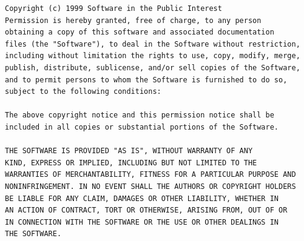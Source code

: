 \documentclass[mingoth,a4paper]{jsarticle}
\begin{document}
{{{{{{{{{\begin{multicols}{2}
\begin{fontsize}{6}{6}
\begin{verbatim}
Copyright (c) 1999 Software in the Public Interest
Permission is hereby granted, free of charge, to any person
obtaining a copy of this software and associated documentation
files (the "Software"), to deal in the Software without restriction,
including without limitation the rights to use, copy, modify, merge,
publish, distribute, sublicense, and/or sell copies of the Software,
and to permit persons to whom the Software is furnished to do so,
subject to the following conditions:

The above copyright notice and this permission notice shall be
included in all copies or substantial portions of the Software.

THE SOFTWARE IS PROVIDED "AS IS", WITHOUT WARRANTY OF ANY
KIND, EXPRESS OR IMPLIED, INCLUDING BUT NOT LIMITED TO THE
WARRANTIES OF MERCHANTABILITY, FITNESS FOR A PARTICULAR PURPOSE AND
NONINFRINGEMENT. IN NO EVENT SHALL THE AUTHORS OR COPYRIGHT HOLDERS
BE LIABLE FOR ANY CLAIM, DAMAGES OR OTHER LIABILITY, WHETHER IN
AN ACTION OF CONTRACT, TORT OR OTHERWISE, ARISING FROM, OUT OF OR
IN CONNECTION WITH THE SOFTWARE OR THE USE OR OTHER DEALINGS IN
THE SOFTWARE.
 \end{verbatim}
 \end{fontsize}
\end{multicols}


}}}}}}}}}
\end{document}
